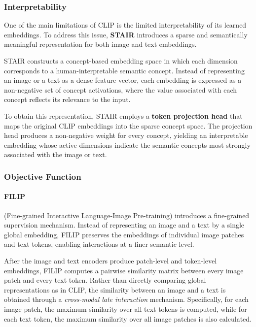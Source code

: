 \subsubsection{Interpretability}
One of the main limitations of CLIP is the limited interpretability of its learned embeddings. 
To address this issue, \textbf{STAIR} introduces a sparse and semantically meaningful representation for both image and text embeddings.

STAIR constructs a concept-based embedding space in which each dimension corresponds to a human-interpretable semantic concept. 
Instead of representing an image or a text as a dense feature vector, each embedding is expressed as a non-negative set of concept activations, 
where the value associated with each concept reflects its relevance to the input.

To obtain this representation, STAIR employs a \textbf{token projection head} that maps the original CLIP embeddings into the sparse concept space. The projection head produces a non-negative weight for every concept, yielding an interpretable embedding whose active dimensions indicate the semantic concepts most strongly associated with the image or text.


\subsubsection{Objective Function}

\paragraph{FILIP} (Fine-grained Interactive Language-Image Pre-training) introduces a fine-grained supervision mechanism. 
Instead of representing an image and a text by a single global embedding, FILIP preserves the embeddings of individual image patches 
and text tokens, enabling interactions at a finer semantic level.

After the image and text encoders produce patch-level and token-level embeddings, FILIP computes a pairwise similarity matrix between every image patch and every text token. 
Rather than directly comparing global representations as in CLIP, the similarity between an image and a text is obtained through a \emph{cross-modal late interaction} mechanism. 
Specifically, for each image patch, the maximum similarity over all text tokens is computed, while for each text token, the maximum similarity over all image patches is also calculated. 

